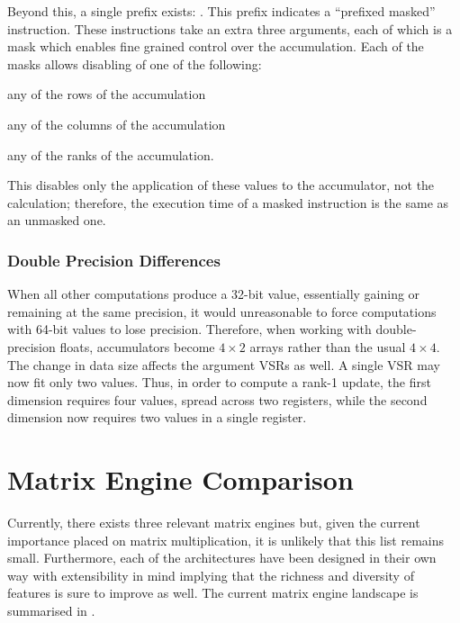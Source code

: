 \documentclass[\main/thesis.tex]{subfiles}
\begin{document}
Beyond this, a single prefix exists: .
This prefix indicates a ``prefixed masked'' instruction.
These instructions take an extra three arguments, each of which is a mask which enables fine grained control over the accumulation.
Each of the masks allows disabling of one of the following:
\begin{enumerate*}[itemjoin*={{ or }}, label=\textbf{(\arabic*)}, after={.}]
  \item any of the rows of the accumulation
  \item any of the columns of the accumulation
  \item any of the ranks of the accumulation.
\end{enumerate*}
This disables only the application of these values to the accumulator, not the calculation; therefore, the execution time of a masked instruction is the same as an unmasked one.

\subsubsection{Double Precision Differences}
\label{sec:doubles}
When all other computations produce a 32-bit value, essentially gaining or remaining at the same precision, it would unreasonable to force computations with 64-bit values to lose precision.
Therefore, when working with double-precision floats, accumulators become $4 \times 2$ arrays rather than the usual $4 \times 4$.
The change in data size affects the argument VSRs as well.
A single VSR may now fit only two values.
Thus, in order to compute a rank-1 update, the first dimension requires four values, spread across two registers, while the second dimension now requires two values in a single register.

\section{Matrix Engine Comparison}
\label{sec:matrixEngines}
Currently, there exists three relevant matrix engines but, given the current importance placed on matrix multiplication, it is unlikely that this list remains small.
Furthermore, each of the architectures have been designed in their own way with extensibility in mind implying that the richness and diversity of features is sure to improve as well.
The current matrix engine landscape is summarised in .
\end{document}
